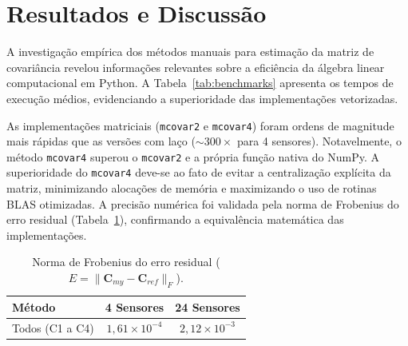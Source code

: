 \section{Resultados e Discussão}
\label{chap:resultados}

A investigação empírica dos métodos manuais para estimação da matriz de covariância revelou informações relevantes sobre a eficiência da álgebra linear computacional em Python. A Tabela~\ref{tab:benchmarks} apresenta os tempos de execução médios, evidenciando a superioridade das implementações vetorizadas.

\begin{table}[h]
\centering
\caption{Benchmarks de tempo de execução (Média $\pm$ Desvio Padrão em ms) para 100 rodadas.}
\label{tab:benchmarks}
\end{table}

As implementações matriciais (\texttt{mcovar2} e \texttt{mcovar4}) foram ordens de magnitude mais rápidas que as versões com laço ($\sim 300\times$ para 4 sensores). Notavelmente, o método \texttt{mcovar4} superou o \texttt{mcovar2} e a própria função nativa do NumPy. A superioridade do \texttt{mcovar4} deve-se ao fato de evitar a centralização explícita da matriz, minimizando alocações de memória e maximizando o uso de rotinas BLAS otimizadas. A precisão numérica foi validada pela norma de Frobenius do erro residual (Tabela~\ref{tab:normas_erro}), confirmando a equivalência matemática das implementações.

\begin{table}[h]
\centering
\caption{Norma de Frobenius do erro residual ($E = \| \mathbf{C}_{my} - \mathbf{C}_{ref} \|_F$).}
\label{tab:normas_erro}
\begin{tabular}{l|cc}
\toprule
\textbf{Método} & \textbf{4 Sensores} & \textbf{24 Sensores} \\
\midrule
Todos (C1 a C4) & $1{,}61 \times 10^{-4}$ & $2{,}12 \times 10^{-3}$ \\
\bottomrule
\end{tabular}
\end{table}

